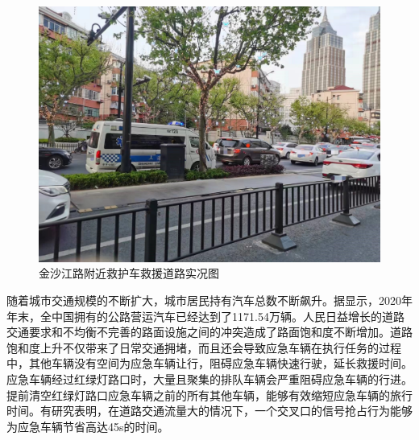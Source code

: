 \begin{figure}[ht]
	\centering
	\includegraphics[width=\textwidth]{figures/ambulance_road_live_map_2.jpg}
	\caption{金沙江路附近救护车救援道路实况图}
	\label{fig:ambulance_road_live_map_2}
\end{figure}


随着城市交通规模的不断扩大，城市居民持有汽车总数不断飙升。据\cite{gongbao}显示，2020年年末，全中国拥有的公路营运汽车已经达到了1171.54万辆。人民日益增长的道路交通要求和不均衡不完善的路面设施之间的冲突造成了路面饱和度不断增加。道路饱和度上升不仅带来了日常交通拥堵，而且还会导致应急车辆在执行任务的过程中，其他车辆没有空间为应急车辆让行，阻碍应急车辆快速行驶，延长救援时间。应急车辆经过红绿灯路口时，大量且聚集的排队车辆会严重阻碍应急车辆的行进。提前清空红绿灯路口应急车辆之前的所有其他车辆，能够有效缩短应急车辆的旅行时间。有研究表明，在道路交通流量大的情况下，一个交叉口的信号抢占行为能够为应急车辆节省高达45s的时间\cite{wang_design_2013}。



